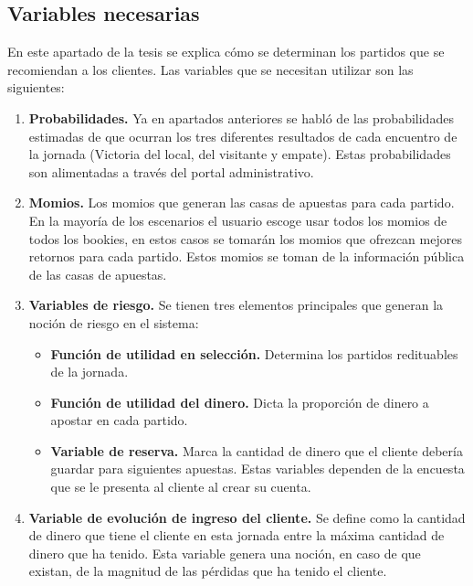 \subsection{Variables necesarias}
\label{subsec:variables-necesarias}
En este apartado de la tesis se explica cómo se determinan los partidos que se recomiendan a los clientes.
Las variables que se necesitan utilizar son las siguientes:
\begin{enumerate}
	\item \textbf{Probabilidades.} Ya en apartados anteriores se habló de las probabilidades estimadas de que ocurran los tres diferentes resultados de cada encuentro de la jornada (Victoria del local, del visitante y empate). Estas probabilidades son alimentadas a través del portal administrativo.
	
	\item \textbf{Momios.} Los momios que generan las casas de apuestas para cada partido. En la mayoría de los escenarios el usuario escoge usar todos los momios de todos los bookies, en estos casos se tomarán los momios que ofrezcan mejores retornos para cada partido. Estos momios se toman de la información pública de las casas de apuestas.
	
	\item \textbf{Variables de riesgo.} Se tienen tres elementos principales que generan la noción de riesgo en el sistema:
	\begin{itemize}
		\item \textbf{Función de utilidad en selección.} Determina los partidos redituables de la jornada.
		\item \textbf{Función de utilidad del dinero.} Dicta la proporción de dinero a apostar en cada partido.
		\item \textbf{Variable de reserva.} Marca la cantidad de dinero que el cliente debería guardar para siguientes apuestas.
		Estas variables dependen de la encuesta que se le presenta al cliente al crear su cuenta.
	\end{itemize}
	
	\item \textbf{Variable de evolución de ingreso del cliente.} Se define como la cantidad de dinero que tiene el cliente en esta jornada entre la máxima cantidad de dinero que ha tenido. Esta variable genera una noción, en caso de que existan, de la magnitud de las pérdidas que ha tenido el cliente.
\end{enumerate}

